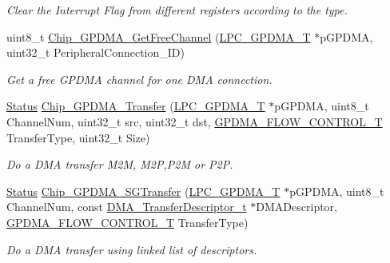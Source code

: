 \begin{DoxyCompactItemize}
\begin{DoxyCompactList}\small\item\em Clear the Interrupt Flag from different registers according to the type. \end{DoxyCompactList}\item 
uint8\-\_\-t \hyperlink{group__GPDMA__17XX__40XX_ga55ff3d61ec382dbec4775bed2db2cde2}{Chip\-\_\-\-G\-P\-D\-M\-A\-\_\-\-Get\-Free\-Channel} (\hyperlink{structLPC__GPDMA__T}{L\-P\-C\-\_\-\-G\-P\-D\-M\-A\-\_\-\-T} $\ast$p\-G\-P\-D\-M\-A, uint32\-\_\-t Peripheral\-Connection\-\_\-\-I\-D)
\begin{DoxyCompactList}\small\item\em Get a free G\-P\-D\-M\-A channel for one D\-M\-A connection. \end{DoxyCompactList}\item 
\hyperlink{group__LPC__Types__Public__Types_ga67a0db04d321a74b7e7fcfd3f1a3f70b}{Status} \hyperlink{group__GPDMA__17XX__40XX_ga53a4dbf10ce59c17b0dd2284fa635580}{Chip\-\_\-\-G\-P\-D\-M\-A\-\_\-\-Transfer} (\hyperlink{structLPC__GPDMA__T}{L\-P\-C\-\_\-\-G\-P\-D\-M\-A\-\_\-\-T} $\ast$p\-G\-P\-D\-M\-A, uint8\-\_\-t Channel\-Num, uint32\-\_\-t src, uint32\-\_\-t dst, \hyperlink{group__GPDMA__17XX__40XX_ga2cb59b641cd840f22780c44be1208133}{G\-P\-D\-M\-A\-\_\-\-F\-L\-O\-W\-\_\-\-C\-O\-N\-T\-R\-O\-L\-\_\-\-T} Transfer\-Type, uint32\-\_\-t Size)
\begin{DoxyCompactList}\small\item\em Do a D\-M\-A transfer M2\-M, M2\-P,P2\-M or P2\-P. \end{DoxyCompactList}\item 
\hyperlink{group__LPC__Types__Public__Types_ga67a0db04d321a74b7e7fcfd3f1a3f70b}{Status} \hyperlink{group__GPDMA__17XX__40XX_ga6a2f7c7238f4288cb73baec79c3e38a7}{Chip\-\_\-\-G\-P\-D\-M\-A\-\_\-\-S\-G\-Transfer} (\hyperlink{structLPC__GPDMA__T}{L\-P\-C\-\_\-\-G\-P\-D\-M\-A\-\_\-\-T} $\ast$p\-G\-P\-D\-M\-A, uint8\-\_\-t Channel\-Num, const \hyperlink{group__GPDMA__17XX__40XX_ga23dbdf610f0d1f61ae30a69944bbee55}{D\-M\-A\-\_\-\-Transfer\-Descriptor\-\_\-t} $\ast$D\-M\-A\-Descriptor, \hyperlink{group__GPDMA__17XX__40XX_ga2cb59b641cd840f22780c44be1208133}{G\-P\-D\-M\-A\-\_\-\-F\-L\-O\-W\-\_\-\-C\-O\-N\-T\-R\-O\-L\-\_\-\-T} Transfer\-Type)
\begin{DoxyCompactList}\small\item\em Do a D\-M\-A transfer using linked list of descriptors. \end{DoxyCompactList}\item 

\end{DoxyCompactItemize}

